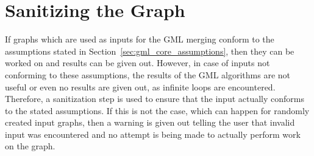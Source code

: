 \documentclass[a4paper,12pt,twoside,BCOR=10mm]{scrbook}
\begin{document}
\section{Sanitizing the Graph}

If graphs which are used as inputs for the GML merging conform to the assumptions
stated in Section~\ref{sec:gml_core_assumptions},
then they can be worked on and results can be given out.
However, in case of inputs not conforming to these assumptions, the results of the GML algorithms
are not useful or even no results are given out, as infinite loops are encountered.
Therefore, a sanitization step is used to ensure that the input actually conforms to the
stated assumptions. If this is not the case, which can happen for randomly created input graphs,
then a warning is given out telling the user that invalid input was encountered and
no attempt is being made to actually perform work on the graph.
\end{document}
